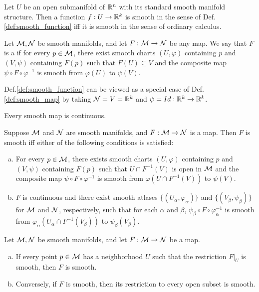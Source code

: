 \documentclass[11pt,a4paper]{article}
\begin{document}
\begin{prop}
Let $U$ be an open submanifold of $\mathbb{R}^n$ with its standard smooth manifold structure. Then a function $f:U\rightarrow \mathbb{R}^k$ is smooth in the sense of Def.\ref{def:smooth_function} iff it is smooth in the sense of ordinary calculus.
\end{prop}

\begin{definition}\label{def:smooth_map}
Let $\mathcal{M}, \mathcal{N}$ be smooth manifolds, and let $F:\mathcal{M}\rightarrow \mathcal{N}$ be any map. We say that $F$ is a  if for every $p\in\mathcal{M}$, there exist smooth charts $(U,\varphi)$ containing $p$ and $(V,\psi)$ containing $F(p)$ such that $F(U)\subseteq V$ and the composite map $\psi\circ F\circ \varphi^{-1}$ is smooth from $\varphi(U)$ to $\psi(V)$.
\end{definition}

\begin{note}
Def.\ref{def:smooth_function} can be viewed as a special case of Def.\ref{def:smooth_map} by taking $\mathcal{N}=V=\mathbb{R}^k$ and $\psi=Id:\mathbb{R}^k\rightarrow \mathbb{R}^k$.
\end{note}

\begin{prop}
Every smooth map is continuous.
\end{prop}

\begin{prop}
Suppose $\mathcal{M}$ and $\mathcal{N}$ are smooth manifolds, and $F:\mathcal{M}\rightarrow \mathcal{N}$ is a map. Then $F$ is smooth iff either of the following conditions is satisfied:
\begin{enumerate}[(a)]
    \item For every $p\in\mathcal{M}$, there exists smooth charts $(U,\varphi)$ containing $p$ and $(V,\psi)$ containing $F(p)$ such that $U\cap F^{-1}(V)$ is open in $\mathcal{M}$ and the composite map $\psi\circ F\circ \varphi^{-1}$ is smooth from $\varphi(U\cap F^{-1}(V))$ to $\psi(V)$.
    \item $F$ is continuous and there exist smooth atlases $\{(U_\alpha,\varphi_\alpha)\}$ and $\{(V_\beta,\psi_\beta)\}$ for $\mathcal{M}$ and $\mathcal{N}$, respectively, such that for each $\alpha$ and $\beta$, $\psi_\beta\circ F\circ \varphi_\alpha^{-1}$ is smooth from $\varphi_\alpha(U_\alpha\cap F^{-1}(V_\beta))$ to $\psi_\beta(V_\beta)$.
\end{enumerate}
\end{prop}

\begin{prop}
Let $\mathcal{M},\mathcal{N}$ be smooth manifolds, and let $F:\mathcal{M}\rightarrow \mathcal{N}$ be a map.
\begin{enumerate}[(a)]
    \item If every point $p\in\mathcal{M}$ has a neighborhood $U$ such that the restriction $F|_U$ is smooth, then $F$ is smooth.
    \item Conversely, if $F$ is smooth, then its restriction to every open subset is smooth.
\end{enumerate}
\end{prop}
\end{document}
